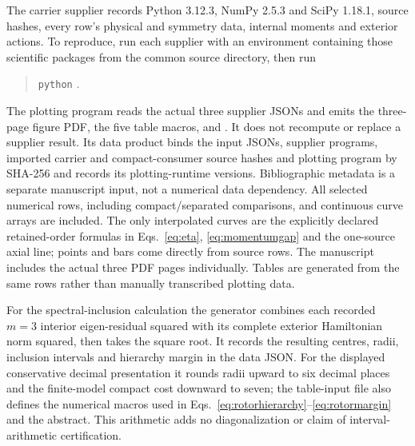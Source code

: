 \documentclass[11pt]{article}
\begin{document}
The carrier supplier records Python 3.12.3, NumPy 2.5.3 and SciPy 1.18.1, source hashes, every row's physical and symmetry data, internal moments and exterior actions. To reproduce, run each supplier with an environment containing those scientific packages from the common source directory, then run
\begin{quote}\small\texttt{python} .
\end{quote}
The plotting program reads the actual three supplier JSONs and emits the three-page figure PDF, the five table macros, and . It does not recompute or replace a supplier result. Its data product binds the input JSONs, supplier programs, imported carrier and compact-consumer source hashes and plotting program by SHA-256 and records its plotting-runtime versions. Bibliographic metadata is a separate manuscript input, not a numerical data dependency. All selected numerical rows, including compact/separated comparisons, and continuous curve arrays are included. The only interpolated curves are the explicitly declared retained-order formulas in Eqs.~\eqref{eq:eta}, \eqref{eq:momentumgap} and the one-source axial line; points and bars come directly from source rows. The manuscript includes the actual three PDF pages individually. Tables are generated from the same rows rather than manually transcribed plotting data.

For the spectral-inclusion calculation the generator combines each recorded $m=3$ interior eigen-residual squared with its complete exterior Hamiltonian norm squared, then takes the square root. It records the resulting centres, radii, inclusion intervals and hierarchy margin in the data JSON. For the displayed conservative decimal presentation it rounds radii upward to six decimal places and the finite-model compact cost downward to seven; the table-input file also defines the numerical macros used in Eqs.~\eqref{eq:rotorhierarchy}--\eqref{eq:rotormargin} and the abstract. This arithmetic adds no diagonalization or claim of interval-arithmetic certification.



\end{document}
